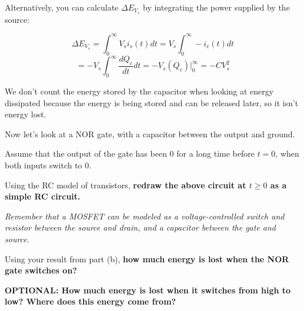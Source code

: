 \begin{enumerate}
{Alternatively, you can calculate $\Delta E_{V_s}$ by integrating the power supplied by the source:



\[\Delta E_{V_s} = \int_0^\infty V_s i_s(t)dt = V_s\int_0^\infty-i_c(t)dt\]
\[= -V_s \int_0^\infty \frac{dQ_c}{dt}dt = -V_s(Q_c) \big|_0^\infty = -CV_s^2\]

We don't count the energy stored by the capacitor when looking at energy dissipated because the energy is being stored and can be released later, so it isn't energy lost.
}
\end{enumerate}

Now let's look at a NOR gate, with a capacitor between the output and ground.




Assume that the output of the gate has been $0$ for a long time before $t=0$, when both inputs switch to $0$.

\begin{enumerate}[resume]
\qitem Using the RC model of transistors, \textbf{redraw the above circuit at $t\geq 0$ as a simple RC circuit.}

\textit{Remember that a MOSFET can be modeled as a voltage-controlled switch and resistor between the source and drain, and a capacitor between the gate and source.}

\ws{\vspace{125px}}


\qitem Using your result from part (b), \textbf{how much energy is lost when the NOR gate switches on?}

\ws{\vspace{60px}}

\sol{
    

\[\Delta E_R = \frac{1}{2}C_\ell V_{DD}^2\]
}

\qitem \textbf{OPTIONAL: How much energy is lost when it switches from high to low? Where does this energy come from?}



\end{enumerate}
